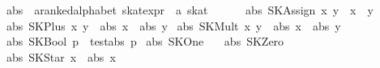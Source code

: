 \documentclass{llncs}
\begin{document}
\begin{isabellebody}
\isanewline
{}\isamarkupfalse%
\ abs\ {}{}\ {}{}a{}{}ranked{}alphabet\ skat{}expr\ {}\ {}a\ skat{}\ {}{}{}{}{}{}\ {}{}{}{}{}\ {}{}{}{}\ \isanewline
\ \ {}abs\ {}SKAssign\ x\ y{}\ {}\ x\ {}{}\ y{}\isanewline
{}\ {}abs\ {}SKPlus\ x\ y{}\ {}\ abs\ x\ {}\ abs\ y{}\isanewline
{}\ {}abs\ {}SKMult\ x\ y{}\ {}\ abs\ x\ {}\ abs\ y{}\isanewline
{}\ {}abs\ {}SKBool\ p{}\ {}\ test{}abs\ p{}\isanewline
{}\ {}abs\ SKOne\ {}\ {}{}\isanewline
{}\ {}abs\ SKZero\ {}\ {}{}\isanewline
{}\ {}abs\ {}SKStar\ x{}\ {}\ {}abs\ x{}\isanewline
\end{isabellebody}
\end{document}
